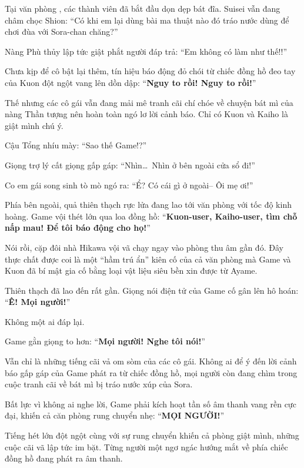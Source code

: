 \documentclass[../main.tex]{subfiles}
\begin{document}

Tại văn phòng \hll, các thành viên đã bắt đầu dọn dẹp bát đĩa. Suisei vẫn đang châm chọc Shion: ``Có khi em lại dùng bài ma thuật nào đó tráo nước dùng để chơi đùa với Sora-chan chăng?''

Nàng Phù thủy lập tức giật phắt người đáp trả: ``Em không có làm như thế!!''

Chưa kịp để cô bật lại thêm, tín hiệu báo động đỏ chói từ chiếc đồng hồ đeo tay của Kuon đột ngột vang lên dồn dập: ``\textbf{Nguy to rồi! Nguy to rồi!}''

Thế nhưng các cô gái vẫn đang mải mê tranh cãi chí chóe về chuyện bát mì của nàng Thần tượng nên hoàn toàn ngó lơ lời cảnh báo. Chỉ có Kuon và Kaiho là giật mình chú ý.

Cậu Tổng nhíu mày: ``Sao thế Game!?''

Giọng trợ lý cất giọng gấp gáp: ``Nhìn\dots\ Nhìn ở bên ngoài cửa sổ đi!''

Co em gái song sinh tò mò ngó ra: ``Ể? Có cái gì ở ngoài-- Ôi mẹ ơi!''

Phía bên ngoài, quả thiên thạch rực lửa đang lao tới văn phòng với tốc độ kinh hoàng. Game vội thét lớn qua loa đồng hồ: ``\textbf{Kuon-user, Kaiho-user, tìm chỗ nấp mau! Để tôi báo động cho họ!}''

Nói rồi, cặp đôi nhà Hikawa vội vã chạy ngay vào phòng thu âm gần đó. Đây thực chất được coi là một ``hầm trú ẩn'' kiên cố của cả văn phòng mà Game và Kuon đã bí mật gia cố bằng loại vật liệu siêu bền xin được từ Ayame.

Thiên thạch đã lao đến rất gần. Giọng nói điện tử của Game cố gân lên hô hoán: ``\textbf{Ê! Mọi người!}''

Không một ai đáp lại.

Game gằn giọng to hơn: ``\textbf{Mọi người! Nghe tôi nói!}''

Vẫn chỉ là những tiếng cãi vả om sòm của các cô gái. Không ai để ý đến lời cảnh báo gấp gáp của Game phát ra từ chiếc đồng hồ, mọi người còn đang chìm trong cuộc tranh cãi về bát mì bị tráo nước xúp của Sora.


Bất lực vì không ai nghe lời, Game phải kích hoạt tần số âm thanh vang rền cực đại, khiến cả căn phòng rung chuyển nhẹ: ``{\Large{\textbf{MỌI NGƯỜI!}}}''

Tiếng hét lớn đột ngột cùng với sự rung chuyển khiến cả phòng giật mình, những cuộc cãi vã lập tức im bặt. Từng người một ngơ ngác hướng mắt về phía chiếc đồng hồ đang phát ra âm thanh.
\end{document}
